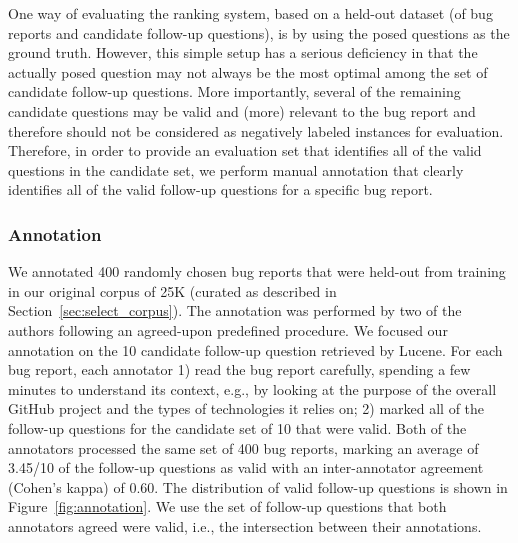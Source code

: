 One way of evaluating the ranking system, based on a held-out dataset (of bug reports and candidate follow-up questions), is
by using the posed questions as the ground truth. However, this simple setup has a serious deficiency in that the actually posed question
may not always be the most optimal among the set of candidate follow-up questions. More importantly, several of
the remaining candidate questions may be valid and (more) relevant to the bug report and therefore should
not be considered as negatively labeled instances for evaluation. Therefore, in order to provide an evaluation
set that identifies all of the valid questions in the candidate set, we perform manual annotation that clearly
identifies all of the valid follow-up questions for a specific bug report.



\subsubsection{Annotation}
We annotated 400 randomly chosen bug reports that were held-out from training in our original corpus of 25K (curated as described in Section~\ref{sec:select_corpus}). The annotation
was performed by two of the authors following an agreed-upon predefined procedure. We focused our annotation on the 10 candidate follow-up question retrieved by Lucene. For each bug report, each annotator 1)
read the bug report carefully, spending a few minutes to understand its context, e.g., by looking at the purpose of the overall GitHub
project and the types of technologies it relies on; 2) marked all of the follow-up questions for the candidate set of 10
that were valid. Both of the annotators processed the same set of 400 bug reports, marking an average of 3.45/10 of the follow-up questions as valid with an inter-annotator agreement (Cohen's kappa) of 0.60. The distribution of valid follow-up questions is shown in Figure~\ref{fig:annotation}.
We use the set of follow-up questions that both annotators agreed were valid, i.e., the intersection between their annotations.



